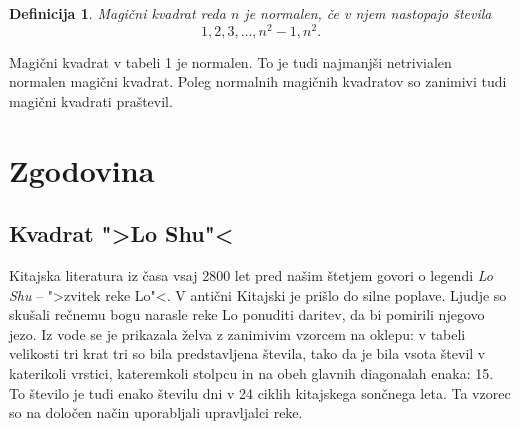\documentclass[a4paper,12pt]{article}
\newtheorem{Definicija}{Definicija}
\begin{document}


\begin{Definicija}
      Magični kvadrat reda $n$ je \emph{normalen}, če v njem nastopajo števila
      \begin{equation}
         1, 2, 3, \ldots, n^2-1, n^2.
      \end{equation}
\end{Definicija}

Magični kvadrat v tabeli 1 je normalen.
To je tudi najmanjši netrivialen normalen magični kvadrat.
Poleg normalnih magičnih kvadratov so zanimivi tudi magični kvadrati praštevil.


\section{Zgodovina}

\subsection{Kvadrat ">Lo Shu"<}

Kitajska literatura iz časa vsaj 2800 let pred našim štetjem govori o legendi
\emph{Lo Shu} -- ">zvitek reke Lo"<. V antični Kitajski je prišlo do
silne poplave. Ljudje so skušali rečnemu bogu narasle reke Lo ponuditi daritev,
da bi pomirili njegovo jezo. Iz vode se je prikazala želva z zanimivim vzorcem
na oklepu: v tabeli velikosti tri krat tri so bila predstavljena števila, tako
da je bila vsota števil v katerikoli vrstici, kateremkoli stolpcu in na obeh
glavnih diagonalah enaka: 15. To število je tudi enako številu dni v 24 ciklih
kitajskega sončnega leta. Ta vzorec so na določen način uporabljali upravljalci
reke.

\end{document}
